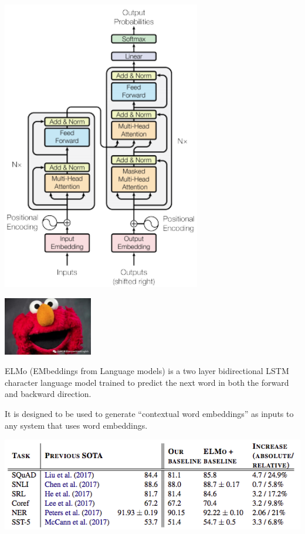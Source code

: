 {\centerline{\includegraphics[height=5in]{../images/Transformerb}}





\centerline{\includegraphics[height = 1in]{../images/ELMob}}

\vfill
ELMo (EMbeddings from Language models) is a two layer bidirectional LSTM character language model trained to predict the next word
in both the forward and backward direction.

\vfill
It is designed to be used to generate ``contextual word embeddings'' as inputs to any system that uses word embeddings.


\centerline{\includegraphics[width=8in]{../images/ELMo}}



}
